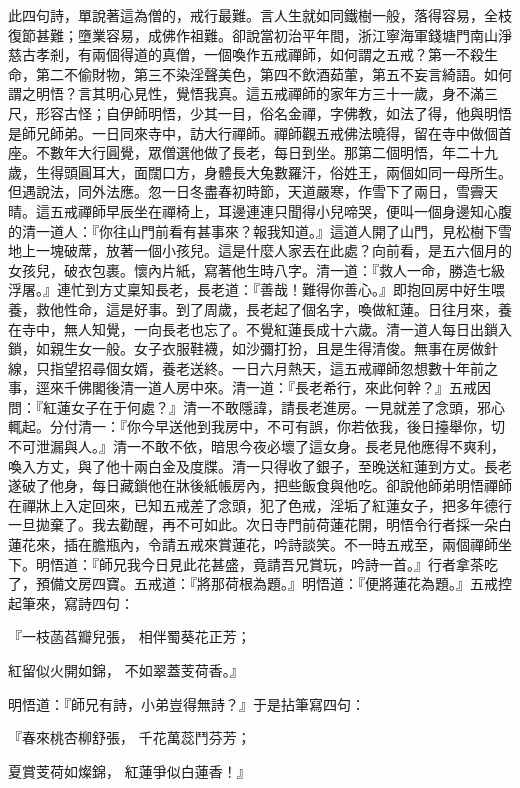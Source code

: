 \begin{showcontents}{}
此四句詩，單說著這為僧的，戒行最難。言人生就如同鐵樹一般，落得容易，全枝復節甚難；墮業容易，成佛作祖難。卻說當初治平年間，浙江寧海軍錢塘門南山淨慈古孝剎，有兩個得道的真僧，一個喚作五戒禪師，如何謂之五戒？第一不殺生命，第二不偷財物，第三不染淫聲美色，第四不飲酒茹葷，第五不妄言綺語。如何謂之明悟？言其明心見性，覺悟我真。這五戒禪師的家年方三十一歲，身不滿三尺，形容古怪；自伊師明悟，少其一目，俗名金禪，字佛教，如法了得，他與明悟是師兄師弟。一日同來寺中，訪大行禪師。禪師觀五戒佛法曉得，留在寺中做個首座。不數年大行圓覺，眾僧選他做了長老，每日到坐。那第二個明悟，年二十九歲，生得頭圓耳大，面闊口方，身體長大兔數羅汗，俗姓王，兩個如同一母所生。但遇說法，同外法應。忽一日冬盡春初時節，天道嚴寒，作雪下了兩日，雪霽天晴。這五戒禪師早辰坐在禪椅上，耳邊連連只聞得小兒啼哭，便叫一個身邊知心腹的清一道人：『你往山門前看有甚事來？報我知道。』這道人開了山門，見松樹下雪地上一塊破蓆，放著一個小孩兒。這是什麼人家丟在此處？向前看，是五六個月的女孩兒，破衣包裹。懷內片紙，寫著他生時八字。清一道：『救人一命，勝造七級浮屠。』連忙到方丈稟知長老，長老道：『善哉！難得你善心。』即抱回房中好生喂養，救他性命，這是好事。到了周歲，長老起了個名字，喚做紅蓮。日往月來，養在寺中，無人知覺，一向長老也忘了。不覺紅蓮長成十六歲。清一道人每日出鎖入鎖，如親生女一般。女子衣服鞋襪，如沙彌打扮，且是生得清俊。無事在房做針線，只指望招尋個女婿，養老送終。一日六月熱天，這五戒禪師忽想數十年前之事，逕來千佛閣後清一道人房中來。清一道：『長老希行，來此何幹？』五戒因問：『紅蓮女子在于何處？』清一不敢隱諱，請長老進房。一見就差了念頭，邪心輒起。分付清一：『你今早送他到我房中，不可有誤，你若依我，後日擡舉你，切不可泄漏與人。』清一不敢不依，暗思今夜必壞了這女身。長老見他應得不爽利，喚入方丈，與了他十兩白金及度牒。清一只得收了銀子，至晚送紅蓮到方丈。長老遂破了他身，每日藏鎖他在牀後紙帳房內，把些飯食與他吃。卻說他師弟明悟禪師在禪牀上入定回來，已知五戒差了念頭，犯了色戒，淫垢了紅蓮女子，把多年德行一旦拋棄了。我去勸醒，再不可如此。次日寺門前荷蓮花開，明悟令行者採一朵白蓮花來，插在膽瓶內，令請五戒來賞蓮花，吟詩談笑。不一時五戒至，兩個禪師坐下。明悟道：『師兄我今日見此花甚盛，竟請吾兄賞玩，吟詩一首。』行者拿茶吃了，預備文房四寶。五戒道：『將那荷根為題。』明悟道：『便將蓮花為題。』五戒控起筆來，寫詩四句：

『一枝菡萏瓣兒張，  相伴蜀葵花正芳；

紅留似火開如錦，  不如翠蓋芰荷香。』

明悟道：『師兄有詩，小弟豈得無詩？』于是拈筆寫四句：

『春來桃杏柳舒張，  千花萬蕊鬥芬芳；

夏賞芰荷如燦錦，  紅蓮爭似白蓮香！』


\end{showcontents}

